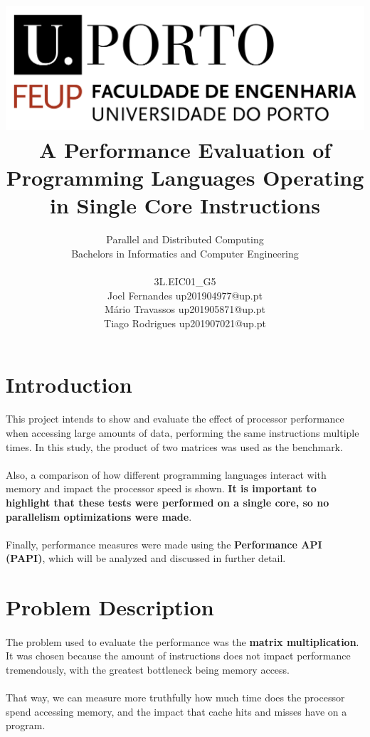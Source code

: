 \documentclass[11pt]{report}
\title{\includegraphics[scale=0.3]{logo.png} \\ \textbf{A Performance Evaluation of Programming Languages Operating in Single Core Instructions}}
\author{Parallel and Distributed Computing \\ Bachelors in Informatics and Computer Engineering \\ \\ 3L.EIC01\_G5   \\ Joel Fernandes up201904977@up.pt \\ Mário Travassos up201905871@up.pt \\ Tiago Rodrigues up201907021@up.pt }
\begin{document}
    \maketitle

    \newpage

    \section*{Introduction}

    \paragraph{}This project intends to show and evaluate the effect of processor performance when accessing large amounts of data, performing the same instructions multiple times. In this study, the product of two matrices was used as the benchmark.

    \paragraph{}Also, a comparison of how different programming languages interact with memory and impact the processor speed is shown. \textbf{It is important to highlight that these tests were performed on a single core, so no parallelism optimizations were made}.

    \paragraph{}Finally, performance measures were made using the \textbf{Performance API (PAPI)}, which will be analyzed and discussed in further detail.

    \section*{Problem Description}

    \paragraph{}The problem used to evaluate the performance was the \textbf{matrix multiplication}. It was chosen because the amount of instructions does not impact performance tremendously, with the greatest bottleneck being memory access.

    \paragraph{}That way, we can measure more truthfully how much time does the processor spend accessing memory, and the impact that cache hits and misses have on a program.
\end{document}
